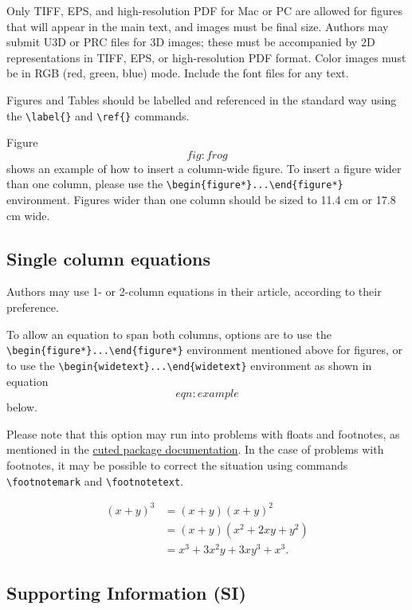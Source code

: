 \documentclass[9pt,twocolumn,twoside,]{pnas-new}
\begin{document}
Only TIFF, EPS, and high-resolution PDF for Mac or PC are allowed for
figures that will appear in the main text, and images must be final
size. Authors may submit U3D or PRC files for 3D images; these must be
accompanied by 2D representations in TIFF, EPS, or high-resolution PDF
format. Color images must be in RGB (red, green, blue) mode. Include the
font files for any text.

Figures and Tables should be labelled and referenced in the standard way
using the \texttt{\textbackslash{}label\{\}} and
\texttt{\textbackslash{}ref\{\}} commands.

Figure \[fig:frog\] shows an example of how to insert a column-wide
figure. To insert a figure wider than one column, please use the
\texttt{\textbackslash{}begin\{figure*\}...\textbackslash{}end\{figure*\}}
environment. Figures wider than one column should be sized to 11.4 cm or
17.8 cm wide.

\subsection*{Single column equations}\label{single-column-equations}

Authors may use 1- or 2-column equations in their article, according to
their preference.

To allow an equation to span both columns, options are to use the
\texttt{\textbackslash{}begin\{figure*\}...\textbackslash{}end\{figure*\}}
environment mentioned above for figures, or to use the
\texttt{\textbackslash{}begin\{widetext\}...\textbackslash{}end\{widetext\}}
environment as shown in equation \[eqn:example\] below.

Please note that this option may run into problems with floats and
footnotes, as mentioned in the \href{http://texdoc.net/pkg/cuted}{cuted
package documentation}. In the case of problems with footnotes, it may
be possible to correct the situation using commands
\texttt{\textbackslash{}footnotemark} and
\texttt{\textbackslash{}footnotetext}.

\[\begin{aligned}
(x+y)^3&=(x+y)(x+y)^2\\
       &=(x+y)(x^2+2xy+y^2) \label{eqn:example} \\
       &=x^3+3x^2y+3xy^3+x^3. 
\end{aligned}\]

\subsection*{Supporting Information
(SI)}\label{supporting-information-si}
\end{document}
